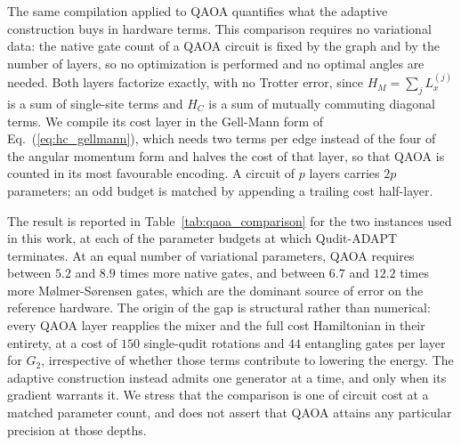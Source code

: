 The same compilation applied to QAOA quantifies what the adaptive construction buys in hardware terms. This comparison requires no variational data: the native gate count of a QAOA circuit is fixed by the graph and by the number of layers, so no optimization is performed and no optimal angles are needed. Both layers factorize exactly, with no Trotter error, since $H_M=\sum_j L_x^{(j)}$ is a sum of single-site terms and $H_C$ is a sum of mutually commuting diagonal terms. We compile its cost layer in the Gell-Mann form of Eq.~(\ref{eq:hc_gellmann}), which needs two terms per edge instead of the four of the angular momentum form and halves the cost of that layer, so that QAOA is counted in its most favourable encoding. A circuit of $p$ layers carries $2p$ parameters; an odd budget is matched by appending a trailing cost half-layer.

The result is reported in Table~\ref{tab:qaoa_comparison} for the two instances used in this work, at each of the parameter budgets at which Qudit-ADAPT terminates. At an equal number of variational parameters, QAOA requires between $5.2$ and $8.9$ times more native gates, and between $6.7$ and $12.2$ times more M\o{}lmer-S\o{}rensen gates, which are the dominant source of error on the reference hardware. The origin of the gap is structural rather than numerical: every QAOA layer reapplies the mixer and the full cost Hamiltonian in their entirety, at a cost of $150$ single-qudit rotations and $44$ entangling gates per layer for $G_2$, irrespective of whether those terms contribute to lowering the energy. The adaptive construction instead admits one generator at a time, and only when its gradient warrants it. We stress that the comparison is one of circuit cost at a matched parameter count, and does not assert that QAOA attains any particular precision at those depths.

